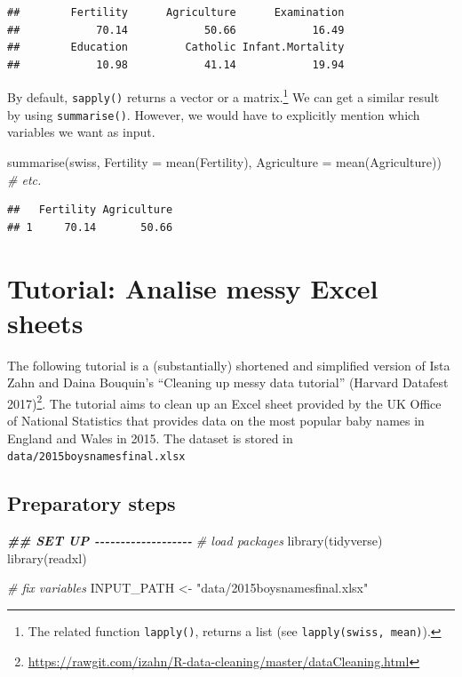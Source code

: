 \documentclass[
  12pt,
]{style/krantz}
\newenvironment{Shaded}{\begin{snugshade}}{\end{snugshade}}
\newcommand{\AttributeTok}[1]{\textcolor[rgb]{0.77,0.63,0.00}{#1}}
\newcommand{\CommentTok}[1]{\textcolor[rgb]{0.56,0.35,0.01}{\textit{#1}}}
\newcommand{\DocumentationTok}[1]{\textcolor[rgb]{0.56,0.35,0.01}{\textbf{\textit{#1}}}}
\newcommand{\FunctionTok}[1]{\textcolor[rgb]{0.00,0.00,0.00}{#1}}
\newcommand{\NormalTok}[1]{#1}
\newcommand{\OtherTok}[1]{\textcolor[rgb]{0.56,0.35,0.01}{#1}}
\newcommand{\StringTok}[1]{\textcolor[rgb]{0.31,0.60,0.02}{#1}}
\renewcommand{\href}[2]{#2\footnote{\url{#1}}}
\begin{document}
\begin{verbatim}
##        Fertility      Agriculture      Examination 
##            70.14            50.66            16.49 
##        Education         Catholic Infant.Mortality 
##            10.98            41.14            19.94
\end{verbatim}

By default, \texttt{sapply()} returns a vector or a matrix.\footnote{The related function \texttt{lapply()}, returns a list (see \texttt{lapply(swiss,\ mean)}).} We can get a similar result by using \texttt{summarise()}. However, we would have to explicitly mention which variables we want as input.

\begin{Shaded}
\begin{Highlighting}[]
\FunctionTok{summarise}\NormalTok{(swiss,}
          \AttributeTok{Fertility =} \FunctionTok{mean}\NormalTok{(Fertility),}
          \AttributeTok{Agriculture =} \FunctionTok{mean}\NormalTok{(Agriculture)) }\CommentTok{\# etc.}
\end{Highlighting}
\end{Shaded}

\begin{verbatim}
##   Fertility Agriculture
## 1     70.14       50.66
\end{verbatim}

\hypertarget{tutorial-analise-messy-excel-sheets}{%
\section{Tutorial: Analise messy Excel sheets}\label{tutorial-analise-messy-excel-sheets}}

The following tutorial is a (substantially) shortened and simplified version of Ista Zahn and Daina Bouquin's \href{https://rawgit.com/izahn/R-data-cleaning/master/dataCleaning.html}{``Cleaning up messy data tutorial'' (Harvard Datafest 2017)}. The tutorial aims to clean up an Excel sheet provided by the UK Office of National Statistics that provides data on the most popular baby names in England and Wales in 2015. The dataset is stored in \texttt{data/2015boysnamesfinal.xlsx}

\hypertarget{preparatory-steps}{%
\subsection{Preparatory steps}\label{preparatory-steps}}

\begin{Shaded}
\begin{Highlighting}[]
\DocumentationTok{\#\# SET UP {-}{-}{-}{-}{-}{-}{-}{-}{-}{-}{-}{-}{-}{-}{-}{-}{-}{-}{-}}
\CommentTok{\# load packages}
\FunctionTok{library}\NormalTok{(tidyverse)}
\FunctionTok{library}\NormalTok{(readxl)}

\CommentTok{\# fix variables}
\NormalTok{INPUT\_PATH }\OtherTok{\textless{}{-}} \StringTok{"data/2015boysnamesfinal.xlsx"}
\end{Highlighting}
\end{Shaded}
\end{document}
